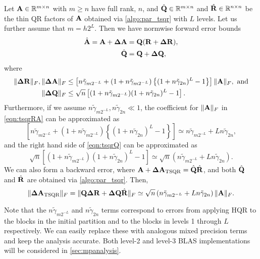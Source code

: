\begin{theorem}
	\label{thm:moriTSQR}
	Let $\mathbf{A}\in\mathbb{R}^{m\times n}$ with $m\geq n$ have full rank, $n$, and $\hat{\mathbf{Q}}\in\mathbb{R}^{m\times n}$ and $\hat{\mathbf{R}}\in\mathbb{R}^{n\times n}$ be the thin QR factors of $\mathbf{A}$ obtained via \cref{algo:par_tsqr} with $L$ levels. 
	Let us further assume that $m = h2^L$.
	Then we have normwise forward error bounds
	\begin{align*}
	\hat{\mathbf{A}} = \mathbf{A} +\mathbf{\Delta A} &=  \mathbf{Q}(\mathbf{R} + \mathbf{\Delta R}),\\
	\hat{\mathbf{Q}} &= \mathbf{Q} + \mathbf{\Delta Q},
	\end{align*}
	where
	\begin{align}
	\|\bb{\Delta R}\|_F, \|\bb{\Delta A}\|_F &\leq \left[n\tilde{\gamma}_{m2^{-L}}+(1+n\tilde{\gamma}_{m2^{-L}})\left\{(1+n\tilde{\gamma}_{ 2n})^L-1\right\}\right]\|\bb{A}\|_F, \text{ and} \label{eqn:tsqrRA}\\
	\|\bb{\Delta Q}\|_F &\leq \sqrt{n}\left[(1+n\tilde{\gamma}_{m2^{-L}})(1+n\tilde{\gamma}_{ 2n})^L -1\right].\label{eqn:tsqrQ}
	\end{align}
	Furthermore, if we assume $n\tilde{\gamma}_{m2^{-L}}, n\tilde{\gamma}_{ 2n} \ll 1$, the coefficient for $\|\mathbf{A}\|_F$ in \cref{eqn:tsqrRA} can be approximated as
	\begin{equation}
	\left[n\tilde{\gamma}_{m2^{-L}}+(1+n\tilde{\gamma}_{m2^{-L}})\left\{(1+n\tilde{\gamma}_{ 2n})^L-1\right\}\right] \simeq n\tilde{\gamma}_{m2^{-L}} + Ln\tilde{\gamma}_{ 2n}, %
	\end{equation}
	and the right hand side of \cref{eqn:tsqrQ} can be approximated as
	\begin{equation}
	\sqrt{n}\left[(1+n\tilde{\gamma}_{m2^{-L}})(1+n\tilde{\gamma}_{ 2n})^L -1\right]\simeq \sqrt{n}\left(n\tilde{\gamma}_{m2^{-L}} + Ln\tilde{\gamma}_{ 2n}\right). %
	\end{equation}
	We can also form a backward error, where $\mathbf{A}+\mathbf{\Delta \mathbf{A}_{\text{TSQR}}} = \hat{\mathbf{Q}}\hat{\mathbf{R}}$, and both $\hat{\mathbf{Q}}$ and $\hat{\mathbf{R}}$ are obtained via \cref{algo:par_tsqr}.
	Then,
	\begin{equation}
	\|\mathbf{\Delta \mathbf{A}_{\text{TSQR}}}\|_F =\|\mathbf{Q \Delta R} + \mathbf{\Delta Q}\hat{\mathbf{R}}\|_F \simeq \sqrt{n}\left(n\tilde{\gamma}_{m2^{-L}} + Ln\tilde{\gamma}_{ 2n}\right)\|\mathbf{A}\|_F.
	\end{equation}
\end{theorem}

Note that the $n\tilde{\gamma}_{m2^{-L}}$ and $n\tilde{\gamma}_{ 2n}$ terms correspond to errors from applying HQR to the blocks in the initial partition and to the blocks in levels 1 through $L$ respectively.
We can easily replace these with analogous mixed precision terms and keep the analysis accurate.
Both level-2 and level-3 BLAS implementations will be considered in \cref{sec:mpanalysis}.